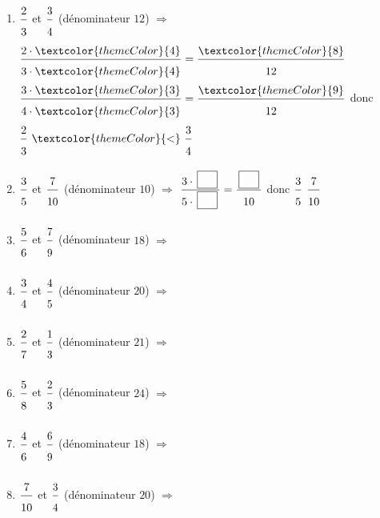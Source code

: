\begin{enumerate}[leftmargin=*,align=parleft, label=\alph*), itemsep=12pt]
\item $\FA{2}{3}$ et $\FA{3}{4}$ \quad (dénominateur $12$) \quad $\Longrightarrow$ \quad $\FA{2 \cdot \textcolor{themeColor}{4}}{3 \cdot \textcolor{themeColor}{4}}=\FA{\textcolor{themeColor}{8}}{12}$ \quad $\FA{3 \cdot \textcolor{themeColor}{3}}{4 \cdot \textcolor{themeColor}{3}}=\FA{\textcolor{themeColor}{9}}{12}$ \quad donc $\FA{2}{3}\ \textcolor{themeColor}{<}\ \FA{3}{4}$
\item $\FA{3}{5}$ et $\FA{7}{10}$ \quad (dénominateur $10$) \quad $\Longrightarrow$ \quad $\FA{3 \cdot \CaseC}{5 \cdot \CaseC}=\FA{\CaseC}{10}$ \quad donc $\FA{3}{5}$ \CercleSigne $\FA{7}{10}$
\item $\FA{5}{6}$ et $\FA{7}{9}$ \quad (dénominateur $18$) \quad $\Longrightarrow$
\item $\FA{3}{4}$ et $\FA{4}{5}$ \quad (dénominateur $20$) \quad $\Longrightarrow$
\item $\FA{2}{7}$ et $\FA{1}{3}$ \quad (dénominateur $21$) \quad $\Longrightarrow$
\item $\FA{5}{8}$ et $\FA{2}{3}$ \quad (dénominateur $24$) \quad $\Longrightarrow$
\item $\FA{4}{6}$ et $\FA{6}{9}$ \quad (dénominateur $18$) \quad $\Longrightarrow$
\item $\FA{7}{10}$ et $\FA{3}{4}$ \quad (dénominateur $20$) \quad $\Longrightarrow$
\end{enumerate}

\newcommand{\LettreCercle}[1]{\tikz[baseline=(char.base)]\node[draw,circle,inner sep=2pt,minimum size=7mm] (char) {#1};}
\newcommand{\QuestionMsg}[1]{\par\medskip\noindent #1\par\smallskip}
\newcommand{\CoeurDessin}[3]{\begin{scope}[shift={(#1,#2)},scale=0.22]\path[draw=black,thick,fill=#3](0,0).. controls (-2,2) and (-4,-1) .. (0,-4).. controls (4,-1) and (2,2) .. (0,0);\end{scope}}

\newpage


